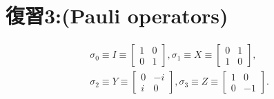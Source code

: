 \hypertarget{hukushuu3}{}
\section{\Large 復習3:(Pauli operators)}
\begin{eqnarray*}
\sigma_0 \equiv I \equiv 
\left[ \begin{array}{cc}
	1 & 0 \\
	0 & 1 
	\end{array}
\right],
\sigma_1 \equiv X \equiv 
\left[ \begin{array}{cc}
	0 & 1 \\
	1 & 0 
	\end{array}
\right],\\
\sigma_2 \equiv Y \equiv 
\left[ \begin{array}{cc}
	0 & -i \\
	i & 0 
	\end{array}
\right],
\sigma_3 \equiv Z \equiv 
\left[ \begin{array}{cc}
	1 & 0 \\
	0 & -1 
	\end{array}
\right].
\end{eqnarray*}
